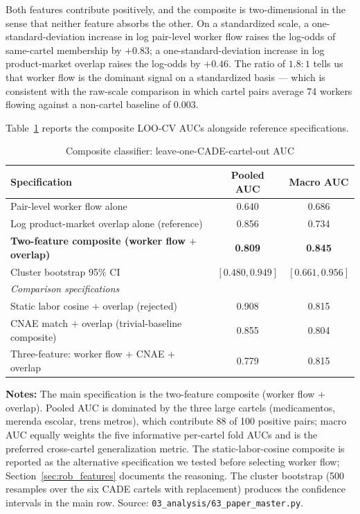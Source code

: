 Both features contribute positively, and the composite is two-dimensional in the sense that neither feature absorbs the other. On a standardized scale, a one-standard-deviation increase in log pair-level worker flow raises the log-odds of same-cartel membership by $+0.83$; a one-standard-deviation increase in log product-market overlap raises the log-odds by $+0.46$. The ratio of $1.8:1$ tells us that worker flow is the dominant signal on a standardized basis --- which is consistent with the raw-scale comparison in which cartel pairs average 74 workers flowing against a non-cartel baseline of 0.003.

Table~\ref{tab:composite_auc} reports the composite LOO-CV AUCs alongside reference specifications.

\begin{table}[htbp]
\centering
\caption{Composite classifier: leave-one-CADE-cartel-out AUC}\label{tab:composite_auc}
\small
\begin{tabular}{lcc}
\toprule
Specification & Pooled AUC & Macro AUC \\
\midrule
Pair-level worker flow alone                       & 0.640 & 0.686 \\
Log product-market overlap alone (reference)       & 0.856 & 0.734 \\[4pt]
\textbf{Two-feature composite (worker flow $+$ overlap)} & \textbf{0.809} & \textbf{0.845} \\
\quad Cluster bootstrap 95\% CI                    & $[0.480, 0.949]$ & $[0.661, 0.956]$ \\[4pt]
\emph{Comparison specifications} \\
\quad Static labor cosine $+$ overlap (rejected)   & 0.908 & 0.815 \\
\quad CNAE match $+$ overlap (trivial-baseline composite) & 0.855 & 0.804 \\
\quad Three-feature: worker flow $+$ CNAE $+$ overlap   & 0.779 & 0.815 \\
\bottomrule
\end{tabular}
\vspace{0.5em}
\begin{minipage}{0.95\textwidth}
\scriptsize{\textbf{Notes:} The main specification is the two-feature composite (worker flow $+$ overlap). Pooled AUC is dominated by the three large cartels (medicamentos, merenda escolar, trens metros), which contribute 88 of 100 positive pairs; macro AUC equally weights the five informative per-cartel fold AUCs and is the preferred cross-cartel generalization metric. The static-labor-cosine composite is reported as the alternative specification we tested before selecting worker flow; Section~\ref{sec:rob_features} documents the reasoning. The cluster bootstrap (500 resamples over the six CADE cartels with replacement) produces the confidence intervals in the main row. Source: \texttt{03\_analysis/63\_paper\_master.py}.\par}
\end{minipage}
\end{table}

